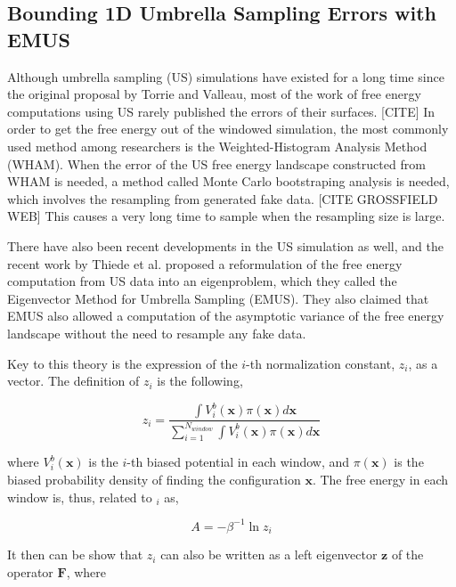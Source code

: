 \begin{spacing}{2.0}
    \subsection{Bounding 1D Umbrella Sampling Errors with EMUS}

    Although umbrella sampling (US) simulations have existed for a long time since the original proposal by Torrie and Valleau, most of the work
    of free energy computations using US rarely published the errors of their surfaces. [CITE] In order to get the free energy out of the 
    windowed simulation, the most commonly used method among researchers is the Weighted-Histogram Analysis Method (WHAM). 
    \cite{P-JCompChem-1992-v13-Kumar} When the error of the US free energy landscape constructed from WHAM is needed, a method called
    Monte Carlo bootstraping analysis is needed, which involves the resampling from generated fake data. [CITE GROSSFIELD WEB] This causes a
    very long time to sample when the resampling size is large. 

    There have also been recent developments in the US simulation as well, and the recent work by Thiede et al. proposed a reformulation of
    the free energy computation from US data into an eigenproblem, which they called the Eigenvector Method for Umbrella Sampling (EMUS).
    \cite{P-JChemPhys-2016-v146-Thiede} They also claimed that EMUS also allowed a computation of the asymptotic variance of the free energy
    landscape without the need to resample any fake data.

    Key to this theory is the expression of the $i$-th normalization constant, $z_i$, as a vector. The definition of $z_i$ is the following,

    \begin{equation}
        z_i = \frac{\int V^b_i(\mathbf{x})\pi(\mathbf{x})d\mathbf{x}}{\sum_{i=1}^{N_{window}}\int V^b_i(\mathbf{x})
            \pi(\mathbf{x})d\mathbf{x}}
    \end{equation}

    \noindent where $V^b_i(\mathbf{x})$ is the $i$-th biased potential in each window, and $\pi(\mathbf{x})$ is the biased probability density
    of finding the configuration $\mathbf{x}$. The free energy in each window is, thus, related to $_i$ as,

    \begin{equation}
        A = -\beta^{-1}\ln z_i
    \end{equation}

    It then can be show that $z_i$ can also be written as a left eigenvector $\mathbf{z}$ of the operator $\mathbf{F}$, where


\end{spacing}
